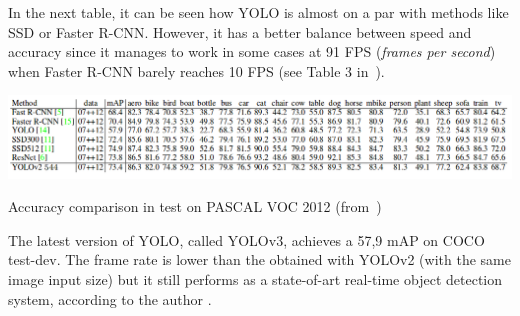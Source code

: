 \begin{itemize}
In the next table, it can be seen how YOLO is almost on a par with methods like SSD or Faster R-CNN. However, it has a better balance between speed and accuracy since it manages to work in some cases at 91 FPS (\textit{frames per second}) when Faster R-CNN barely reaches 10 FPS (see Table 3 in~\cite{redmon2016yolo9000}).
\begin{table}[H]
\begin{center}
\includegraphics[scale=0.45]{previous_version/yolo_results_pascal12.png}
\caption{Accuracy comparison in test on PASCAL VOC 2012 (from~\cite{redmon2016yolo9000})}
\end{center}
\label{table_yolo}
\end{table}
 The latest version of YOLO, called YOLOv3, achieves a 57,9 mAP on COCO test-dev. The frame rate is lower than the obtained with YOLOv2 (with the same image input size) but it still performs as a state-of-art real-time object detection system, according to the author \cite{redmon2018yolov3}.
 \end{itemize}

